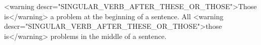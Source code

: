 
    <warning descr="SINGULAR_VERB_AFTER_THESE_OR_THOSE">Those is</warning> a problem at the beginning of a sentence.
    All <warning descr="SINGULAR_VERB_AFTER_THESE_OR_THOSE">those is</warning> problems in the middle of a sentence.
